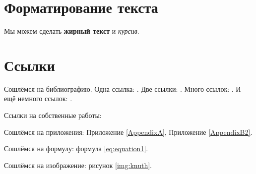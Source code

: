 
\section{Форматирование текста} \label{sect1_1}

Мы можем сделать \textbf{жирный текст} и \textit{курсив}.


\section{Ссылки} \label{sect1_2}
Сошлёмся на библиографию. Одна ссылка: \cite[с.~54]{Sokolov}\cite[с.~36]{Gaidaenko}. Две ссылки: \cite{Sokolov,Gaidaenko}. Много ссылок:  \cite[с.~54]{Lermontov,Management,Borozda} \cite{Lermontov,Management,Borozda,Marketing,Constitution,FamilyCode,Gost.7.0.53,Razumovski,Lagkueva,Pokrovski,Sirotko,Lukina,Methodology,Encyclopedia,Nasirova,Berestova,Kriger}. И ещё немного ссылок: \cite{Article,Book,Booklet,Conference,Inbook,Incollection,Manual,Mastersthesis,Misc,Phdthesis,Proceedings,Techreport,Unpublished}. \cite{medvedev2006jelektronnye, CEAT:CEAT581, doi:10.1080/01932691.2010.513279,Gosele1999161,Li2007StressAnalysis, Shoji199895,test:eisner-sample,AB_patent_Pomerantz_1968,iofis_patent1960}



Ссылки на собственные работы:~\cite{vakbib1, confbib1}

Сошлёмся на приложения: Приложение \ref{AppendixA}, Приложение \ref{AppendixB2}.

Сошлёмся на формулу: формула \eqref{eq:equation1}.

Сошлёмся на изображение: рисунок \ref{img:knuth}.


